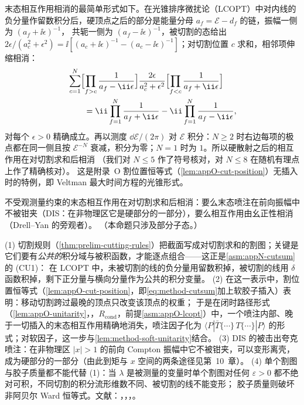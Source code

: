 末态相互作用相消的最简单形式如下。在光锥排序微扰论（LCOPT）中对内线的负分量作留数积分后，硬顶点之后的部分是能量分母 $a_f=\mathcal E-d_f$ 的链，振幅一侧为 $(a_f+\ii\epsilon)^{-1}$，
共轭一侧为 $(a_f-\ii\epsilon)^{-1}$，被切割的态给出 $2\epsilon/(a_c^2+\epsilon^2)=\ii[(a_c+\ii\epsilon)^{-1}-(a_c-\ii\epsilon)^{-1}]$；对切割位置 $c$ 求和，相邻项伸缩相消：
\begin{equation}\label{eq:method-cutsum}
\begin{aligned}
&\sum_{c=1}^{N}\Bigl[\prod_{f>c}\frac{1}{a_f-\ii\epsilon}\Bigr]\frac{2\epsilon}{a_c^2+\epsilon^2}\Bigl[\prod_{f<c}\frac{1}{a_f+\ii\epsilon}\Bigr]\\
&\qquad=\ii\prod_{f=1}^{N}\frac{1}{a_f+\ii\epsilon}-\ii\prod_{f=1}^{N}\frac{1}{a_f-\ii\epsilon} ,
\end{aligned}
\end{equation}
对每个 $\epsilon>0$ 精确成立。再以测度 $\dd\mathcal E/(2\pi)$ 对 $\mathcal E$ 积分：$N\ge2$ 时右边每项的极点都在同一侧且按 $\mathcal E^{-N}$ 衰减，积分为零；$N=1$ 时为 $1$。所以硬散射之后的相互作用在对切割求和后相消
（我们对 $N\le5$ 作了符号核对，对 $N\le8$ 在随机有理点上作了精确核对）。%
这是附录~O 割位置恒等式（\cref{lem:appO-cut-position}）无插入时的特例，即 Veltman 最大时间方程的光锥形式。

\begin{proposition}\label{prop:method-fsi}
不受观测量约束的末态相互作用在对切割求和后相消：要么末态喷注在前向振幅中不被钳夹（DIS：在非物理区它是硬部分的一部分），要么相互作用由幺正性相消（Drell--Yan 的旁观者）。
（本命题只涉及部分子态。）
\end{proposition}

\begin{proofsketch}
(1) 切割规则（\cref{thm:prelim-cutting-rules}）把截面写成对切割求和的割图；关键是它们要有\emph{公共的}积分域与被积函数，才能逐点组合——这正是\cref{asm:appN-cutsum}的 (CU1)：
在 LCOPT 中，未被切割的线的负分量用留数积掉，被切割的线用 $\delta$ 函数积掉，剩下正分量与横向分量作为公共的积分变量。
(2) 在这一表示中，割位置恒等式（\cref{lem:appO-cut-position}，即\cref{eq:method-cutsum}加上软胶子插入）表明：移动切割跨过最晚的顶点只改变该顶点的权重；
于是在闭时路径形式（\cref{lem:appO-unitarity}，\tagR，$R_{\mathrm{cond}}$，前提\cref{asm:appO-lcopt}）中，一个喷注内部、晚于一切插入的末态相互作用精确地消失，喷注因子化为
$\langle P|\bar T\{\cdots\}\,T\{\cdots\}|P\rangle$ 的形式；对软因子，这一步与\cref{lem:method-soft-unitarity}结合。
(3) DIS 的被击出夸克喷注：在非物理区 $|x|>1$ 的前向 Compton 振幅中它不被钳夹，可以变形离壳，成为硬部分的一部分（由此到矩与 $x$ 空间的两条途径见第~10~章）。
(4) 单个割图与胶子质量都不能代替 (1)：当 $\lambda$ 是被测量的变量时单个割图对任何 $\varepsilon>0$ 都不绝对可积，不同切割的积分流形维数不同、被切割的线不能变形；
胶子质量则破坏非阿贝尔 Ward 恒等式。文献：\cite{LibbySterman1978a}，\cite{CollinsSoperSterman1988}，\cite[第~14.4~节]{Collins2011}，\cite{AybatSterman2009}。
\end{proofsketch}

